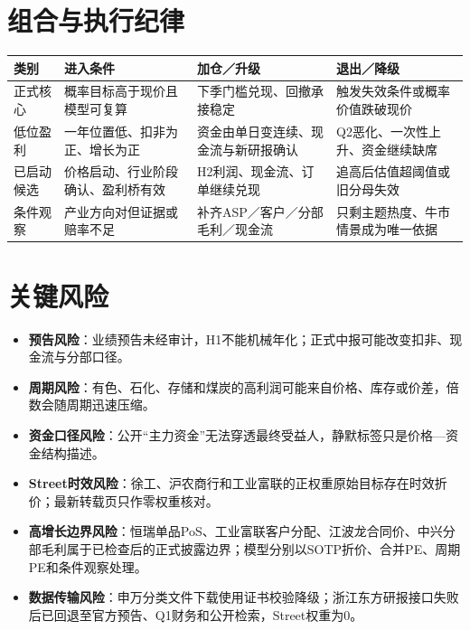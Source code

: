 \section{组合与执行纪律}

\begin{exhibitbox}
\begin{tabularx}{\textwidth}{L{2.4cm}L{3.3cm}L{3.2cm}X}
\toprule
\textbf{类别} & \textbf{进入条件} & \textbf{加仓／升级} & \textbf{退出／降级} \\
\midrule
正式核心 & 概率目标高于现价且模型可复算 & 下季门槛兑现、回撤承接稳定 & 触发失效条件或概率价值跌破现价 \\
低位盈利 & 一年位置低、扣非为正、增长为正 & 资金由单日变连续、现金流与新研报确认 & Q2恶化、一次性上升、资金继续缺席 \\
已启动候选 & 价格启动、行业阶段确认、盈利桥有效 & H2利润、现金流、订单继续兑现 & 追高后估值超阈值或旧分母失效 \\
条件观察 & 产业方向对但证据或赔率不足 & 补齐ASP／客户／分部毛利／现金流 & 只剩主题热度、牛市情景成为唯一依据 \\
\bottomrule
\end{tabularx}
\end{exhibitbox}

\section{关键风险}

\begin{itemize}
  \item \textbf{预告风险}：业绩预告未经审计，H1不能机械年化；正式中报可能改变扣非、现金流与分部口径。
  \item \textbf{周期风险}：有色、石化、存储和煤炭的高利润可能来自价格、库存或价差，倍数会随周期迅速压缩。
  \item \textbf{资金口径风险}：公开“主力资金”无法穿透最终受益人，静默标签只是价格—资金结构描述。
  \item \textbf{Street时效风险}：徐工、沪农商行和工业富联的正权重原始目标存在时效折价；最新转载页只作零权重核对。
  \item \textbf{高增长边界风险}：恒瑞单品PoS、工业富联客户分配、江波龙合同价、中兴分部毛利属于已检查后的正式披露边界；模型分别以SOTP折价、合并PE、周期PE和条件观察处理。
  \item \textbf{数据传输风险}：申万分类文件下载使用证书校验降级；浙江东方研报接口失败后已回退至官方预告、Q1财务和公开检索，Street权重为0。
\end{itemize}

